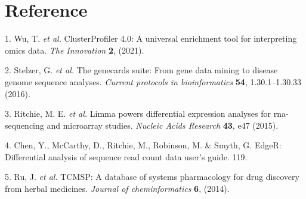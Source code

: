 \documentclass[
]{article}
\newenvironment{cslreferences}%
  {}%
  {\par}
\begin{document}
\hypertarget{bibliography}{%
\section*{Reference}\label{bibliography}}

\hypertarget{refs}{}
\begin{cslreferences}
\leavevmode\hypertarget{ref-ClusterprofilerWuTi2021}{}%
1. Wu, T. \emph{et al.} ClusterProfiler 4.0: A universal enrichment tool for interpreting omics data. \emph{The Innovation} \textbf{2}, (2021).

\leavevmode\hypertarget{ref-TheGenecardsSStelze2016}{}%
2. Stelzer, G. \emph{et al.} The genecards suite: From gene data mining to disease genome sequence analyses. \emph{Current protocols in bioinformatics} \textbf{54}, 1.30.1--1.30.33 (2016).

\leavevmode\hypertarget{ref-LimmaPowersDiRitchi2015}{}%
3. Ritchie, M. E. \emph{et al.} Limma powers differential expression analyses for rna-sequencing and microarray studies. \emph{Nucleic Acids Research} \textbf{43}, e47 (2015).

\leavevmode\hypertarget{ref-EdgerDifferenChen}{}%
4. Chen, Y., McCarthy, D., Ritchie, M., Robinson, M. \& Smyth, G. EdgeR: Differential analysis of sequence read count data user's guide. 119.

\leavevmode\hypertarget{ref-TcmspADatabaRuJi2014}{}%
5. Ru, J. \emph{et al.} TCMSP: A database of systems pharmacology for drug discovery from herbal medicines. \emph{Journal of cheminformatics} \textbf{6}, (2014).
\end{cslreferences}
\end{document}
